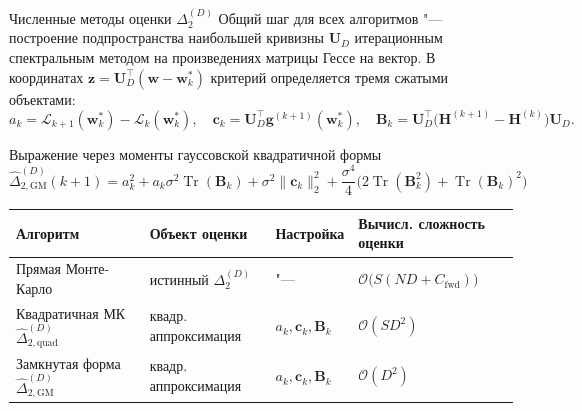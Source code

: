 \documentclass[aspectratio=169]{beamer}
\begin{document}
\begin{frame}{Численные методы оценки $\Delta_2^{(D)}$}
Общий шаг для всех алгоритмов "--- построение подпространства наибольшей кривизны $\mathbf U_D$ итерационным спектральным методом на произведениях матрицы Гессе на вектор. В координатах $\mathbf z = \mathbf U_D^\top (\mathbf w - \mathbf w_k^*)$ критерий определяется тремя сжатыми объектами:
\vspace{-0.2em}
\[
    a_k = \mathcal L_{k+1}(\mathbf w_k^*) - \mathcal L_k(\mathbf w_k^*),
    \quad
    \mathbf c_k = \mathbf U_D^\top \mathbf g^{(k+1)}(\mathbf w_k^*),
    \quad
    \mathbf B_k = \mathbf U_D^\top \big(\mathbf H^{(k+1)} - \mathbf H^{(k)}\big) \mathbf U_D.
\]
\vspace{-1.4em}
\begin{block}{Выражение через моменты гауссовской квадратичной формы}
    \vspace{-0.6em}
    \[
        \widehat \Delta_{2,\mathrm{GM}}^{(D)}(k+1) = a_k^2 + a_k \sigma^2 \operatorname{Tr}(\mathbf B_k) + \sigma^2 \|\mathbf c_k\|_2^2 + \dfrac{\sigma^4}{4}\bigl(2\operatorname{Tr}(\mathbf B_k^2) + \operatorname{Tr}(\mathbf B_k)^2\bigr)
    \]
\end{block}
\begin{table}[ht]
    \centering
    \footnotesize
    \begin{tabular}{@{}p{3.8cm} p{3.4cm} p{2.2cm} p{4.0cm}@{}}
        \toprule
        Алгоритм & Объект оценки & Настройка & Вычисл. сложность оценки \\
        \midrule
        Прямая Монте-Карло & истинный $\Delta_2^{(D)}$ & "--- & $\mathcal O\bigl(S(ND + C_{\mathrm{fwd}})\bigr)$ \\[0.3em]
        Квадратичная МК~$\widehat \Delta_{2,\mathrm{quad}}^{(D)}$ & квадр. аппроксимация & $a_k, \mathbf c_k, \mathbf B_k$ & $\mathcal O(SD^2)$ \\[0.3em]
        Замкнутая форма~$\widehat \Delta_{2,\mathrm{GM}}^{(D)}$ & квадр. аппроксимация & $a_k, \mathbf c_k, \mathbf B_k$ & $\mathcal O(D^2)$ \\
        \bottomrule
    \end{tabular}
\end{table}
\end{frame}
\end{document}
